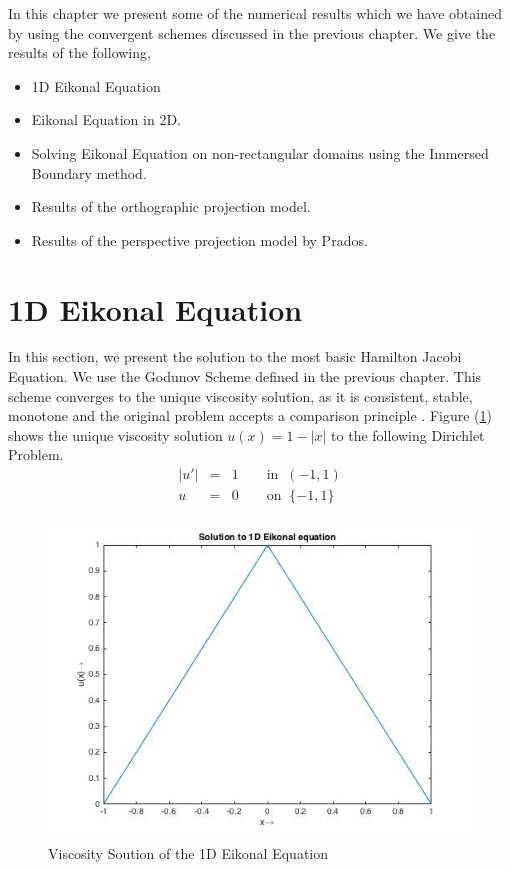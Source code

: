 In this chapter we present some of the numerical results which we have obtained by using the convergent schemes discussed in the previous chapter. We give the results of the following,
\begin{itemize}
	\item
	1D Eikonal Equation
	\item
	Eikonal Equation in 2D.
	\item
	Solving Eikonal Equation on non-rectangular domains using the Immersed Boundary method.
	\item
	Results of the orthographic projection model.
	\item
	Results of the perspective projection model by Prados.	
\end{itemize}

\section{1D Eikonal Equation}
In this section, we present the solution to the most basic Hamilton Jacobi Equation. We use the Godunov Scheme defined in the previous chapter. This scheme converges to the unique viscosity solution, as it is consistent, stable, monotone and the original problem accepts a comparison principle \cite{yong}. Figure (\ref{fig:6}) shows the unique viscosity solution $u(x) = 1-\lvert x \rvert$ to the following Dirichlet Problem.
\begin{eqnarray}
	\lvert u' \rvert &=& 1 \qquad \text{in} \;\; (-1,1)\label{eq:30}\\
	u &=& 0 \qquad \text{on} \;\; \{-1,1\}\label{eq:31}
\end{eqnarray}
\begin{figure}
	\centering
	\includegraphics[scale=0.5]{Images/1deik/21.jpg}
	\caption{Viscosity Soution of the 1D Eikonal Equation}
	\label{fig:6}
\end{figure}

